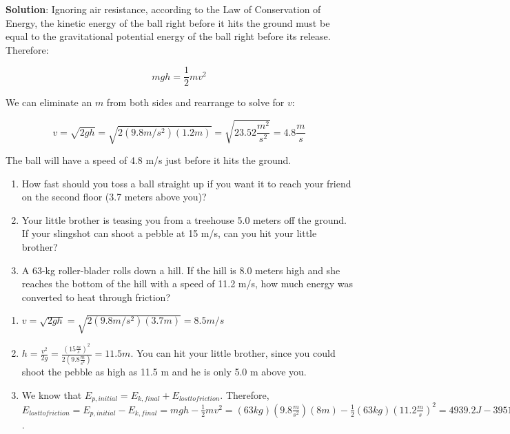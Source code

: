 \textbf{Solution}: Ignoring air resistance, according to the Law of Conservation 
of Energy, the kinetic energy of the ball right before it hits the ground must be 
equal to the gravitational potential energy of the ball right before its release. 
Therefore:

$$mgh = \frac{1}{2}mv^2$$

We can eliminate an $m$ from both sides and rearrange to solve for $v$:

$$v = \sqrt{2gh} = \sqrt{2 \left( 9.8 m/s^2 \right) \left(1.2 m \right)} = 
\sqrt{23.52 \frac{m^2}{s^2}} = 4.8 \frac{m}{s}$$

The ball will have a speed of 4.8 m/s just before it hits the ground. 

\begin{Exercise}[title = {Kinetic and Potential Energy}, label = ke_pe]
\begin{enumerate}
\item How fast should you toss a ball straight up if you want it to reach your 
friend on the second floor (3.7 meters above you)?
\item Your little brother is teasing you from a treehouse 5.0 meters off the 
ground. If your slingshot can shoot a pebble at 15 m/s, can you hit your little 
brother?
\item A 63-kg roller-blader rolls down a hill. If the hill is 8.0 meters high and 
she reaches the bottom of the hill with a speed of 11.2 m/s, how much energy was 
converted to heat through friction?
\end{enumerate}
\vspace{25mm}
\end{Exercise}

\begin{Answer}[ref = ke_pe]
\begin{enumerate}
\item $v = \sqrt{2gh} = \sqrt{2 \left( 9.8 m/s^2 \right) \left( 3.7 m \right)} = 
8.5 m/s$
\item $h = \frac{v^2}{2g} = \frac{\left( 15 \frac{m}{s} \right)^2}{2 \left( 9.8 
\frac{m}{s^2} \right)} = 11.5 m$. You can hit your little brother, since you could 
shoot the pebble as high as 11.5 m and he is only 5.0 m above you.
\item We know that $E_{p, initial} = E_{k, final} + E_{lost to friction}$. 
Therefore, $E_{lost to friction} = E_{p, initial} - E_{k, final} = mgh - \frac{1}{2}
mv^2 = \left(63 kg \right) \left( 9.8 \frac{m}{s^2} \right) \left( 8 m \right) - 
\frac{1}{2} \left( 63 kg \right) \left( 11.2 \frac{m}{s} \right)^2 = 4939.2 J - 
3951.4 J = 988 J$. 
\end{enumerate}
\end{Answer}

